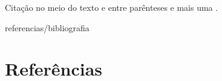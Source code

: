\begin{btUnit}
Citação no meio do texto \citet{Mood1974} e entre parênteses
\citep{Millar2000} e mais uma \citep{Gelman2007}.

\begin{btSect}{referencias/bibliografia}
\section*{Referências}
\btPrintCited
\end{btSect}

\end{btUnit}

